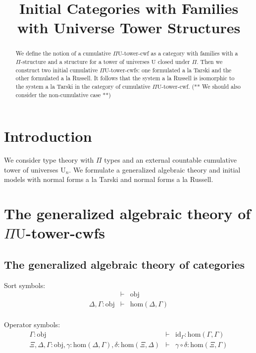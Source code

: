 \documentclass{lmcs}
\title{Initial Categories with Families\\with Universe Tower Structures}
\def\UU{\mathrm{U}}
\def\Obj{\mathrm{obj}}
\def\Hom{\mathrm{hom}}
\def\id{\mathrm{id}}
\begin{document}
\maketitle

\begin{abstract}
We define the notion of a cumulative $\Pi\UU$-tower-cwf as a category with families with a $\Pi$-structure and a structure for a tower of universes $\UU$ closed under $\Pi$. Then we construct two initial cumulative $\Pi\UU$-tower-cwfs: one formulated a la Tarski and the other formulated a la Russell. It follows that the system a la Russell is isomorphic to the system a la Tarski in the category of cumulative $\Pi\UU$-tower-cwf. (** We should also consider the non-cumulative case **)
 \end{abstract}

\allowdisplaybreaks
\section{Introduction}

We consider type theory with $\Pi$ types and an external countable cumulative tower of universes $\UU_n$. We formulate a generalized algebraic theory and initial models with normal forms a la Tarski and normal forms a la Russell.

\section{The generalized algebraic theory of $\Pi\UU$-tower-cwfs}

\subsection{The generalized algebraic theory of categories}
\hspace{1em}

Sort symbols:
\begin{eqnarray*}
&\vdash& \Obj\\
\Delta, \Gamma : \Obj &\vdash& \Hom(\Delta,\Gamma)\\
\end{eqnarray*}

Operator symbols:
\begin{eqnarray*}
\Gamma : \Obj &\vdash& \id_\Gamma : \Hom(\Gamma,\Gamma)\\
\Xi,\Delta,\Gamma : \Obj, \gamma : \Hom(\Delta,\Gamma), \delta : \Hom(\Xi,\Delta) &\vdash&
\gamma \circ \delta : \Hom(\Xi,\Gamma)
\end{eqnarray*}
\end{document}
